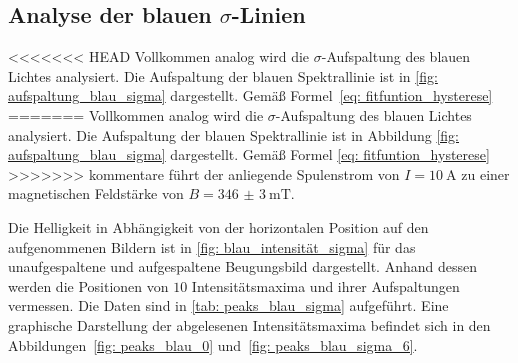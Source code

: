 \subsection{Analyse der blauen $\sigma$-Linien}
<<<<<<< HEAD
Vollkommen analog wird die $\sigma$-Aufspaltung des blauen Lichtes analysiert.
Die Aufspaltung der blauen Spektrallinie ist in \autoref{fig: aufspaltung_blau_sigma} dargestellt.
Gemäß Formel~\eqref{eq: fitfuntion_hysterese}
=======
Vollkommen analog wird die $\sigma$-Aufspaltung des blauen Lichtes analysiert. %
Die Aufspaltung der blauen Spektrallinie ist in Abbildung \ref{fig: aufspaltung_blau_sigma} dargestellt.
Gemäß Formel \eqref{eq: fitfuntion_hysterese}
>>>>>>> kommentare
führt der anliegende Spulenstrom von $I = \SI{10}{\ampere}$ zu einer magnetischen Feldstärke von $B = \SI{346(3)}{\milli\tesla}$.

Die Helligkeit in Abhängigkeit von der horizontalen Position auf den aufgenommenen Bildern ist in \autoref{fig: blau_intensität_sigma} für das unaufgespaltene
und aufgespaltene Beugungsbild dargestellt. Anhand dessen werden die Positionen von $10$ Intensitätsmaxima und ihrer Aufspaltungen
vermessen. Die Daten sind in \autoref{tab: peaks_blau_sigma} aufgeführt.
Eine graphische Darstellung der abgelesenen Intensitätsmaxima befindet sich in den Abbildungen~\ref{fig: peaks_blau_0}
und~\ref{fig: peaks_blau_sigma_6}.

